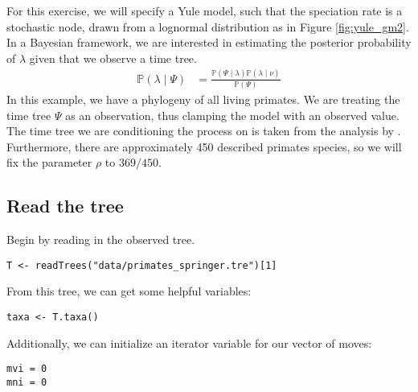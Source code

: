 For this exercise, we will specify a Yule model, such that the speciation rate is a stochastic node, drawn from a lognormal distribution as in Figure \ref{fig:yule_gm2}.
In a Bayesian framework, we are interested in estimating the posterior probability of $\lambda$ given that we observe a time tree.
\begin{align}\label{bayesTher}
\mathbb{P}(\lambda \mid \Psi) &= \frac{\mathbb{P}(\Psi \mid \lambda)\mathbb{P}(\lambda \mid \nu)}{\mathbb{P}(\Psi)}
\end{align}
In this example, we have a phylogeny of all living primates. 
We are treating the time tree $\Psi$ as an observation, thus clamping the model with an observed value.
The time tree we are conditioning the process on is taken from the analysis by \citet{Springer2012}.
Furthermore, there are approximately 450 described primates species, so we will fix the parameter $\rho$ to $369/450$.



\subsection{Read the tree}

Begin by reading in the observed tree. 

{\tt \begin{snugshade*}
\begin{lstlisting}
T <- readTrees("data/primates_springer.tre")[1]
\end{lstlisting}
\end{snugshade*}}

From this tree, we can get some helpful variables:
{\tt \begin{snugshade*}
\begin{lstlisting}
taxa <- T.taxa()
\end{lstlisting}
\end{snugshade*}}

Additionally, we can initialize an iterator variable for our vector of moves:
{\tt \begin{snugshade*}
\begin{lstlisting}
mvi = 0
mni = 0
\end{lstlisting}
\end{snugshade*}}


